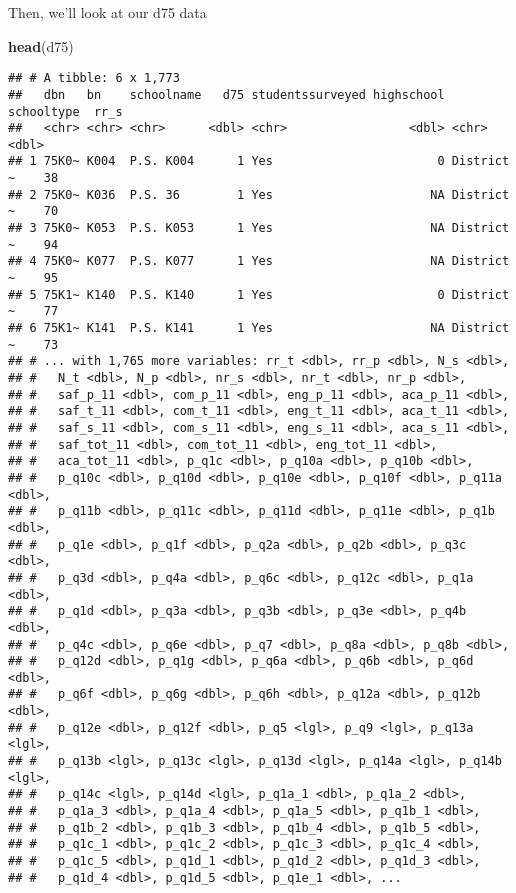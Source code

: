 \documentclass[]{article}
\newenvironment{Shaded}{\begin{snugshade}}{\end{snugshade}}
\newcommand{\KeywordTok}[1]{\textcolor[rgb]{0.13,0.29,0.53}{\textbf{#1}}}
\newcommand{\NormalTok}[1]{#1}
\begin{document}
Then, we'll look at our d75 data

\begin{Shaded}
\begin{Highlighting}[]
\KeywordTok{head}\NormalTok{(d75)}
\end{Highlighting}
\end{Shaded}

\begin{verbatim}
## # A tibble: 6 x 1,773
##   dbn   bn    schoolname   d75 studentssurveyed highschool schooltype  rr_s
##   <chr> <chr> <chr>      <dbl> <chr>                 <dbl> <chr>      <dbl>
## 1 75K0~ K004  P.S. K004      1 Yes                       0 District ~    38
## 2 75K0~ K036  P.S. 36        1 Yes                      NA District ~    70
## 3 75K0~ K053  P.S. K053      1 Yes                      NA District ~    94
## 4 75K0~ K077  P.S. K077      1 Yes                      NA District ~    95
## 5 75K1~ K140  P.S. K140      1 Yes                       0 District ~    77
## 6 75K1~ K141  P.S. K141      1 Yes                      NA District ~    73
## # ... with 1,765 more variables: rr_t <dbl>, rr_p <dbl>, N_s <dbl>,
## #   N_t <dbl>, N_p <dbl>, nr_s <dbl>, nr_t <dbl>, nr_p <dbl>,
## #   saf_p_11 <dbl>, com_p_11 <dbl>, eng_p_11 <dbl>, aca_p_11 <dbl>,
## #   saf_t_11 <dbl>, com_t_11 <dbl>, eng_t_11 <dbl>, aca_t_11 <dbl>,
## #   saf_s_11 <dbl>, com_s_11 <dbl>, eng_s_11 <dbl>, aca_s_11 <dbl>,
## #   saf_tot_11 <dbl>, com_tot_11 <dbl>, eng_tot_11 <dbl>,
## #   aca_tot_11 <dbl>, p_q1c <dbl>, p_q10a <dbl>, p_q10b <dbl>,
## #   p_q10c <dbl>, p_q10d <dbl>, p_q10e <dbl>, p_q10f <dbl>, p_q11a <dbl>,
## #   p_q11b <dbl>, p_q11c <dbl>, p_q11d <dbl>, p_q11e <dbl>, p_q1b <dbl>,
## #   p_q1e <dbl>, p_q1f <dbl>, p_q2a <dbl>, p_q2b <dbl>, p_q3c <dbl>,
## #   p_q3d <dbl>, p_q4a <dbl>, p_q6c <dbl>, p_q12c <dbl>, p_q1a <dbl>,
## #   p_q1d <dbl>, p_q3a <dbl>, p_q3b <dbl>, p_q3e <dbl>, p_q4b <dbl>,
## #   p_q4c <dbl>, p_q6e <dbl>, p_q7 <dbl>, p_q8a <dbl>, p_q8b <dbl>,
## #   p_q12d <dbl>, p_q1g <dbl>, p_q6a <dbl>, p_q6b <dbl>, p_q6d <dbl>,
## #   p_q6f <dbl>, p_q6g <dbl>, p_q6h <dbl>, p_q12a <dbl>, p_q12b <dbl>,
## #   p_q12e <dbl>, p_q12f <dbl>, p_q5 <lgl>, p_q9 <lgl>, p_q13a <lgl>,
## #   p_q13b <lgl>, p_q13c <lgl>, p_q13d <lgl>, p_q14a <lgl>, p_q14b <lgl>,
## #   p_q14c <lgl>, p_q14d <lgl>, p_q1a_1 <dbl>, p_q1a_2 <dbl>,
## #   p_q1a_3 <dbl>, p_q1a_4 <dbl>, p_q1a_5 <dbl>, p_q1b_1 <dbl>,
## #   p_q1b_2 <dbl>, p_q1b_3 <dbl>, p_q1b_4 <dbl>, p_q1b_5 <dbl>,
## #   p_q1c_1 <dbl>, p_q1c_2 <dbl>, p_q1c_3 <dbl>, p_q1c_4 <dbl>,
## #   p_q1c_5 <dbl>, p_q1d_1 <dbl>, p_q1d_2 <dbl>, p_q1d_3 <dbl>,
## #   p_q1d_4 <dbl>, p_q1d_5 <dbl>, p_q1e_1 <dbl>, ...
\end{verbatim}
\end{document}
